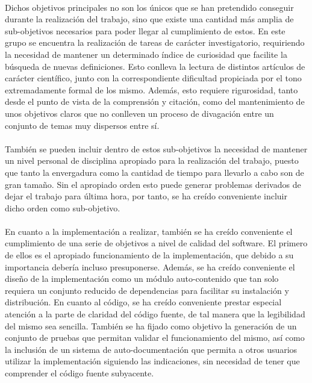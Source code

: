 \documentclass{subfiles}
\begin{document}
      \paragraph{}
      Dichos objetivos principales no son los únicos que se han pretendido conseguir durante la realización del trabajo, sino que existe una cantidad más amplia de sub-objetivos necesarios para poder llegar al cumplimiento de estos. En este grupo se encuentra la realización de tareas de carácter investigatorio, requiriendo la necesidad de mantener un determinado índice de curiosidad que facilite la búsqueda de nuevas definiciones. Esto conlleva la lectura de distintos artículos de carácter científico, junto con la correspondiente dificultad propiciada por el tono extremadamente formal de los mismo. Además, esto requiere rigurosidad, tanto desde el punto de vista de la comprensión y citación, como del mantenimiento de unos objetivos claros que no conlleven un proceso de divagación entre un conjunto de temas muy dispersos entre sí.

      \paragraph{}
      También se pueden incluir dentro de estos sub-objetivos la necesidad de mantener un nivel personal de disciplina apropiado para la realización del trabajo, puesto que tanto la envergadura como la cantidad de tiempo para llevarlo a cabo son de gran tamaño. Sin el apropiado orden esto puede generar problemas derivados de dejar el trabajo para última hora, por tanto, se ha creído conveniente incluir dicho orden como sub-objetivo.

      \paragraph{}
      En cuanto a la implementación a realizar, también se ha creído conveniente el cumplimiento de una serie de objetivos a nivel de calidad del software. El primero de ellos es el apropiado funcionamiento de la implementación, que debido a su importancia debería incluso presuponerse. Además, se ha creído conveniente el diseño de la implementación como un módulo auto-contenido que tan solo requiera un conjunto reducido de dependencias para facilitar su instalación y distribución. En cuanto al código, se ha creído conveniente prestar especial atención a la parte de claridad del código fuente, de tal manera que la legibilidad del mismo sea sencilla. También se ha fijado como objetivo la generación de un conjunto de pruebas que permitan validar el funcionamiento del mismo, así como la inclusión de un sistema de auto-documentación que permita a otros usuarios utilizar la implementación siguiendo las indicaciones, sin necesidad de tener que comprender el código fuente subyacente.
\end{document}
